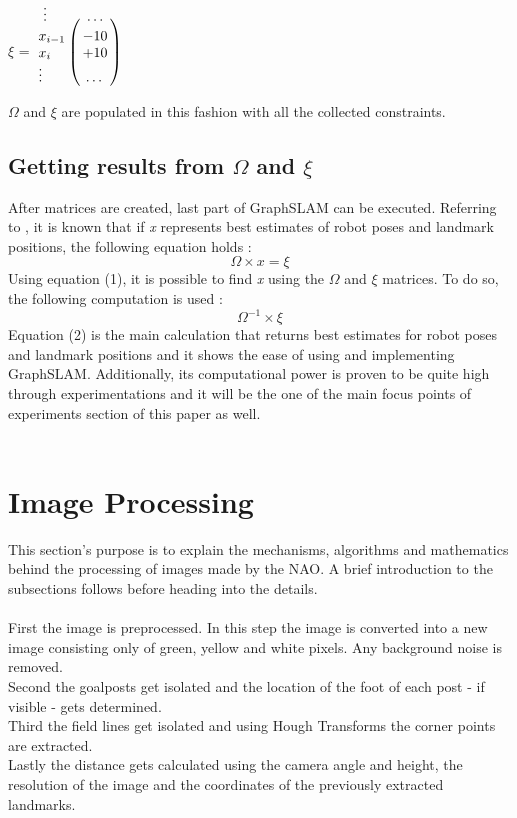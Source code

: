 \documentclass{ba-kecs}
\numberwithin{figure}{section}
\begin{document}
    $\xi$ = $\bordermatrix{~ \vdots & \dots \cr
                  			x_{i-1} & -10 \cr
                  			x_{i}  & +10 \cr
                  			\vdots & \dots \cr}$
                  
	$\Omega$ and $\xi$ are populated in this fashion with all the collected constraints.
	
\subsection{Getting results from $\Omega$ and $\xi$}
	After matrices are created, last part of GraphSLAM can be executed. Referring to \cite{sik2}, it is known that if \textit{x} represents best estimates of robot poses and landmark positions, the following equation holds : \\
	\begin{equation}
	\Omega \times x = \xi
	\end{equation}
	Using equation (1), it is possible to find \textit{x} using the $\Omega$ and $\xi$ matrices. To do so, the following computation is used :\\
	\begin{equation}
	\Omega^{-1} \times \xi
	\end{equation}
	Equation (2) is the main calculation that returns best estimates for robot poses and landmark positions and it shows the ease of using and implementing GraphSLAM. Additionally, its computational power is proven to be quite high through experimentations\cite{sik,sik2} and it will be the one of the main focus points of experiments section of this paper as well.\\ \\


\section{Image Processing}

This section's purpose is to explain the mechanisms, algorithms and mathematics behind the processing of images made by the NAO.
A brief introduction to the subsections follows before heading into the details.\\ \\
First the image is preprocessed. In this step the image is converted into a new image consisting only of green, yellow and white pixels. Any background noise is removed.\\
Second the goalposts get isolated and the location of the foot of each post - if visible - gets determined.\\
Third the field lines get isolated and using Hough Transforms the corner points are extracted.\\
Lastly the distance gets calculated using the camera angle and height, the resolution of the image and the coordinates of the previously extracted landmarks.
\end{document}
